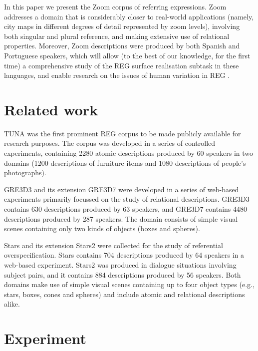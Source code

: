\documentclass[11pt]{article}
\begin{document}
In this paper we present the Zoom corpus of referring expressions. Zoom addresses a domain that is considerably closer to real-world applications (namely, city maps in different degrees of detail represented by zoom levels), involving both singular and plural reference, and making extensive use of relational properties. Moreover, Zoom descriptions were produced by both Spanish and Portuguese speakers, which will allow (to the best of our knowledge, for the first time) a comprehensive study of the REG surface realisation subtask in these languages, and enable research on the issues of human variation in REG \cite{trainable-speaker,romina-coling,non-det}. 


\section{Related work}
\label{sec-background}

TUNA \cite{tuna-corpus} was the first prominent REG corpus to be made publicly available for research purposes. The corpus was developed in a series of controlled experiments, containing 2280 atomic descriptions produced by 60 speakers in two domains (1200 descriptions of furniture items and 1080 descriptions of people's photographs). 

GRE3D3 and its extension GRE3D7 \cite{gre3d3,gre3d7} were developed in a series of web-based experiments primarily focussed on the study of relational descriptions. GRE3D3 contains 630 descriptions produced by 63 speakers, and GRE3D7 contains 4480 descriptions produced by 287 speakers. The domain consists of simple visual scenes containing only two kinds of objects (boxes and spheres).

Stars \cite{stars-mutual-disamb} and its extension Stars2 were collected for the study of referential overspecification. Stars contains 704 descriptions produced by 64 speakers in a web-based experiment. Stars2 was produced in dialogue situations involving subject pairs, and it contains 884 descriptions produced by 56 speakers. Both domains make use of simple visual scenes containing up to four object types (e.g., stars, boxes, cones and spheres) and include atomic and relational descriptions alike. 



\section{Experiment}
\label{sec-experiment}
\end{document}
